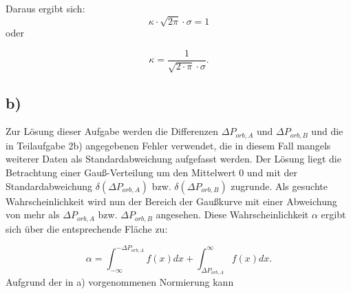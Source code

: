 \documentclass[titlepage]{scrartcl}
\begin{document}
Daraus ergibt sich: 
\begin{equation}
\kappa \cdot \sqrt{2\pi} \cdot \sigma = 1
\end{equation} oder


\begin{equation}
\kappa = \frac{1}{\sqrt{2\cdot \pi} \cdot \sigma}.
\end{equation}



\subsection{b)}
Zur Lösung dieser Aufgabe werden die Differenzen $\Delta P_{orb,A}$ und $\Delta P_{orb,B}$ und die in Teilaufgabe 2b) angegebenen Fehler verwendet, die in diesem Fall mangels weiterer Daten als Standardabweichung aufgefasst werden.
Der Lösung liegt die Betrachtung einer Gauß-Verteilung um den Mittelwert 0 und mit der Standardabweichung $\delta (\Delta P_{orb,A})$ bzw. $\delta (\Delta P_{orb,B})$ zugrunde. Als gesuchte Wahrscheinlichkeit wird nun der Bereich der Gaußkurve mit einer Abweichung von mehr als $\Delta P_{orb,A}$ bzw. $\Delta P_{orb,B}$ angesehen. Diese Wahrscheinlichkeit $\alpha$ ergibt sich über die entsprechende Fläche zu: 

\begin{equation}
\alpha = \int_{-\infty} ^{-\Delta P_{orb,A}} f(x) dx + \int_{\Delta P_{orb,A}} ^{\infty} f(x) dx.
\end{equation}
Aufgrund der in a) vorgenommenen Normierung kann 



\begin{comment}
\begin{thebibliography}{9}
\bibitem[Bec]{kmann} BECKMANN, Dieter. Astrophysik. C.C.Buchner, 2011.
\bibitem[Ort]{szeit} Wikipedia: Ortszeit. Online im Internet: URL: http://de.wikipedia.org/wiki/Ortszeit (Stand: 01.03.2014). 


\end{thebibliography}
\end{comment}
\end{document}

